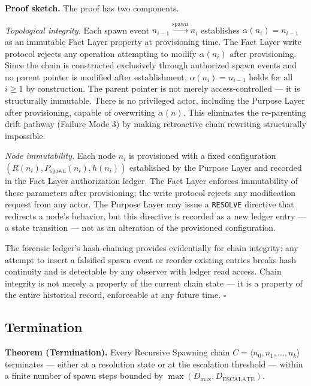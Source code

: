 \medskip
\noindent\textbf{Proof sketch.} The proof has two components.

\medskip
\textit{Topological integrity.} Each spawn event $n_{i-1} \xrightarrow{\mathrm{spawn}} n_i$ establishes $\alpha(n_i) = n_{i-1}$ as an immutable Fact Layer property at provisioning time. The Fact Layer write protocol rejects any operation attempting to modify $\alpha(n_i)$ after provisioning. Since the chain is constructed exclusively through authorized spawn events and no parent pointer is modified after establishment, $\alpha(n_i) = n_{i-1}$ holds for all $i \geq 1$ by construction. The parent pointer is not merely access-controlled — it is structurally immutable. There is no privileged actor, including the Purpose Layer after provisioning, capable of overwriting $\alpha(n)$. This eliminates the re-parenting drift pathway (Failure Mode 3) by making retroactive chain rewriting structurally impossible.

\medskip
\textit{Node immutability.} Each node $n_i$ is provisioned with a fixed configuration $(R(n_i), P_{\mathrm{spawn}}(n_i), h(n_i))$ established by the Purpose Layer and recorded in the Fact Layer authorization ledger. The Fact Layer enforces immutability of these parameters after provisioning; the write protocol rejects any modification request from any actor. The Purpose Layer may issue a \texttt{RESOLVE} directive that redirects a node's behavior, but this directive is recorded as a new ledger entry — a state transition — not as an alteration of the provisioned configuration.

The forensic ledger's hash-chaining provides evidentially for chain integrity: any attempt to insert a falsified spawn event or reorder existing entries breaks hash continuity and is detectable by any observer with ledger read access. Chain integrity is not merely a property of the current chain state — it is a property of the entire historical record, enforceable at any future time. $\square$

\subsection{Termination}
\label{sec:rs-termination}

\medskip
\noindent\textbf{Theorem (Termination).} Every Recursive Spawning chain $C = \langle n_0, n_1, \ldots, n_k \rangle$ terminates — either at a resolution state or at the escalation threshold — within a finite number of spawn steps bounded by $\max(D_{\mathrm{max}}, D_{\mathrm{ESCALATE}})$.

